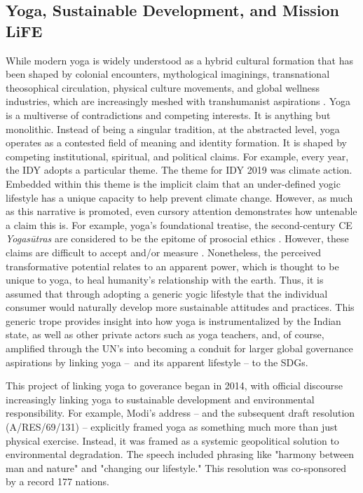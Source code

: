 \documentclass[11pt]{article}
\begin{document}
\subsection{Yoga, Sustainable Development, and Mission LiFE}

While modern yoga is widely understood as a hybrid cultural formation that has been  shaped by colonial encounters, mythological imaginings, transnational theosophical  circulation, physical culture movements, and global wellness industries, which are increasingly meshed with transhumanist aspirations \cite{coskuner2016,ferrandez2024,mccartneyTranshumanist,mccartneyVedic}. Yoga is a multiverse of contradictions and competing interests. It is anything but monolithic. Instead of being a singular tradition, at the abstracted level, yoga operates as a contested field of meaning and identity formation. It is shaped by competing institutional, spiritual, and political claims. For example, every year, the IDY adopts a particular theme. The theme for IDY 2019 was climate action. Embedded within this theme is the implicit claim that an under-defined yogic lifestyle has a unique capacity to help prevent climate change. However, as much as this narrative is promoted, even cursory attention demonstrates how untenable a claim this is. For example, yoga's foundational treatise, the second-century CE \emph{Yogasūtras} are considered to be the epitome of prosocial ethics \cite{ranganathan2008,ranganathan2024}. However, these claims are difficult to accept and/or measure \cite{mccartney2021,mccartney2026}. Nonetheless, the perceived transformative potential relates to an apparent power, which is thought to be unique to yoga, to heal humanity’s relationship with the earth. Thus, it is assumed that through adopting a generic yogic lifestyle that the individual consumer would naturally develop more sustainable attitudes and practices. This generic trope provides insight into how yoga is instrumentalized by the Indian state, as well as other private actors such as yoga teachers, and, of course, amplified through the UN's into becoming a conduit for larger global governance aspirations by linking yoga – and its apparent lifestyle – to the SDGs.

This project of linking yoga to goverance began in 2014, with official discourse increasingly linking yoga to sustainable development and environmental responsibility. For example, Modi's address – and the subsequent draft resolution (A/RES/69/131) – explicitly framed yoga as something much more than just physical exercise. Instead, it was framed as a systemic geopolitical solution to environmental degradation. The speech included phrasing like "harmony between man and nature" and "changing our lifestyle." This resolution was co-sponsored by a record 177 nations. 
\end{document}
